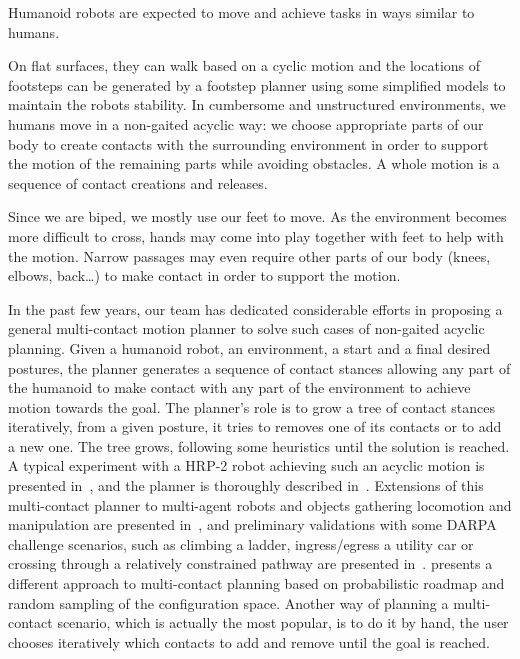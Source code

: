 Humanoid robots are expected to move and achieve tasks in ways similar to humans.

On flat surfaces, they can walk based on a cyclic motion and the locations of footsteps can be generated by a footstep planner using some simplified models to maintain the robots stability.
In cumbersome and unstructured environments, we humans move in a non-gaited acyclic way: we choose appropriate parts of our body to create contacts with the surrounding environment in order to support the motion of the remaining parts while avoiding obstacles.
A whole motion is a sequence of contact creations and releases.

Since we are biped, we mostly use our feet to move.
As the environment becomes more difficult to cross, hands may come into play together with feet to help with the motion.
Narrow passages may even require other parts of our body (knees, elbows, back\dots) to make contact in order to support the motion.

In the past few years, our team has dedicated considerable efforts in proposing a general multi-contact motion planner to solve such cases of non-gaited acyclic planning.
Given a humanoid robot, an environment, a start and a final desired postures, the planner generates a sequence of contact stances allowing any part of the humanoid to make contact with any part of the environment to achieve motion towards the goal.
The planner's role is to grow a tree of contact stances iteratively, from a given posture, it tries to removes one of its contacts or to add a new one.
The tree grows, following some heuristics until the solution is reached.
A typical experiment with a HRP-2 robot achieving such an acyclic motion is presented in~\cite{escande:iser:2008}, and the planner is thoroughly described in~\cite{escande:ras:2013}.
Extensions of this multi-contact planner to multi-agent robots and objects gathering locomotion and manipulation are presented in~\cite{bouyarmane:ar:2012}, and preliminary validations with some DARPA challenge scenarios, such as climbing a ladder, ingress/egress a utility car or crossing through a relatively constrained pathway are presented in~\cite{bouyarmane:humanoids:2012}.
\cite{hauser:issr:2007} presents a different approach to multi-contact planning based on probabilistic roadmap and random sampling of the configuration space.
Another way of planning a multi-contact scenario, which is actually the most popular, is to do it by hand, the user chooses iteratively which contacts to add and remove until the goal is reached.

